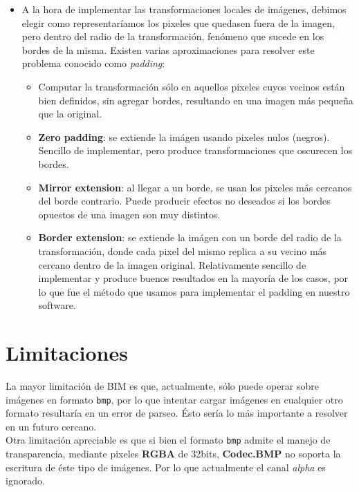 \documentclass[a4paper, 11pt]{article} %
\begin{document}
\begin{itemize}
		\item A la hora de implementar las transformaciones locales de imágenes, debimos elegir como representaríamos los pixeles que quedasen fuera de la imagen, pero dentro del radio de la transformación, fenómeno que sucede en los bordes de la misma. Existen varias aproximaciones para resolver este problema conocido como \textit{padding}:
			\begin{itemize}
				\item Computar la transformación sólo en aquellos pixeles cuyos vecinos están bien definidos, sin agregar bordes, resultando en una imagen más pequeña que la original.
				\item \textbf{Zero padding}: se extiende la imágen usando pixeles nulos (negros). Sencillo de implementar, pero produce transformaciones que oscurecen los bordes.
				\item \textbf{Mirror extension}: al llegar a un borde, se usan los pixeles más cercanos del borde contrario. Puede producir efectos no deseados si los bordes opuestos de una imagen son muy distintos.
				\item \textbf{Border extension}: se extiende la imágen con un borde del radio de la transformación, donde cada pixel del mismo replica a su vecino más cercano dentro de la imagen original. Relativamente sencillo de implementar y produce buenos resultados en la mayoría de los casos, por lo que fue el método que usamos para implementar el padding en nuestro software.
			\end{itemize}
		
		
	\end{itemize}


\section*{Limitaciones}

La mayor limitación de BIM es que, actualmente, sólo puede operar sobre imágenes en formato \texttt{bmp}, por lo que intentar cargar imágenes en cualquier otro formato resultaría en un error de parseo. Ésto sería lo más importante a resolver en un futuro cercano.\\

\noindent Otra limitación apreciable es que si bien el formato \texttt{bmp} admite el manejo de transparencia, mediante pixeles \textbf{RGBA} de 32bits, \textbf{Codec.BMP} no soporta la escritura de éste tipo de imágenes. Por lo que actualmente el canal \textit{alpha} es ignorado. 
\end{document}
